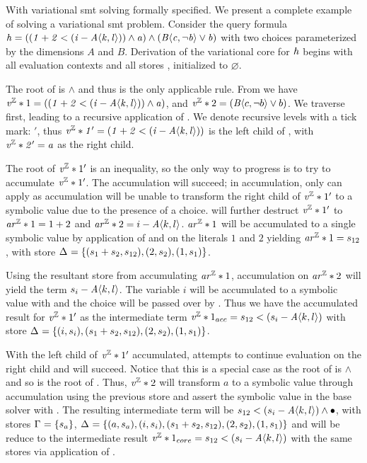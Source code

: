 \label{section:vsmt:example}
%
With variational \ac{smt} solving formally specified. We present a complete
example of solving a variational \ac{smt} problem. Consider the query formula
\newline$\kf{\hV = ((1 + 2 < (i - \chc[A]{k,l})) \wedge a) \wedge
  (\chc[B]{c,\neg b} \vee b)}$ with two choices parameterized by the dimensions
$A$ and $B$. Derivation of the variational core for $\mathit{h}$ begins with all
evaluation contexts and all stores \aStore{}, \eStore{} initialized to
$\varnothing$.

The root of \hV{} is $\wedge$ and thus \evAnd{} is the only applicable rule.
From \evAnd{} we have $\eIL*{1} = \kf{((1 + 2 < (i - \chc[A]{k,l})) \wedge a)}$,
and $\eIL*{2} = (\chc[B]{c,\neg b} \vee b)$. We traverse  first, leading
to a recursive application of \evAnd{}. We denote recursive levels with a tick
mark: $'$, thus $\kf{\eIL*{1}' = (1 + 2 < (i - \chc[A]{k,l}))}$ is the left
child of , with $\mathit{\mathit{v^{\mathbb{Z}}}*{2}' = a}$ as the right child.

The root of $\mathit{v^{\mathbb{Z}}}*{1}'$ is an inequality, so the only way to progress is to try
to accumulate $\mathit{v^{\mathbb{Z}}}*{1}'$. The accumulation will succeed; in accumulation, only
\acInEqV{} can apply as accumulation will be unable to transform the right child
of $\mathit{v^{\mathbb{Z}}}*{1}'$ to a symbolic value due to the presence of a choice. \acInEqV{}
will further destruct $\mathit{v^{\mathbb{Z}}}*{1}'$ to $\mathit{ar^{\mathbb{Z}}}*{1} = 1 + 2$ and $\eAR*{2} = i -
\chc[A]{k,l}$. $\mathit{ar^{\mathbb{Z}}}*{1}$ will be accumulated to a single symbolic value by
application of \acArithS{} and \acRef{} on the literals $1$ and $2$ yielding
$\mathit{ar^{\mathbb{Z}}}*{1} = s_{12}$, with store $\aStore{}=\set{(s_{1} + s_{2}, s_{12}),
  (2,s_{2}), (1,s_{1})}$.

Using the resultant store from accumulating $\mathit{ar^{\mathbb{Z}}}*{1}$, accumulation on
$\mathit{ar^{\mathbb{Z}}}*{2}$ will yield the term $s_{i} - \chc[A]{k,l}$. The variable $i$ will be
accumulated to a symbolic value with \acRef{} and the choice will be passed over
by \acChc{}. Thus we have the accumulated result for $\mathit{v^{\mathbb{Z}}}*{1}'$ as the
intermediate term $\eIL*{1}_{acc} = s_{12} < (s_{i} - \chc[A]{k,l})$ with store
$\aStore{}=\set{(i, s_{i}),(s_{1} + s_{2}, s_{12}), (2,s_{2}), (1,s_{1})}$.

With the left child of $\mathit{v^{\mathbb{Z}}}*{1}'$ accumulated, \evAnd{} attempts to continue
evaluation on the right child and will succeed. Notice that this is a special
case as the root of  is $\wedge$ and so is the root of \hV{}. Thus,
$\mathit{v^{\mathbb{Z}}}*{2}$ will transform $a$ to a symbolic value through accumulation using the
previous store and assert the symbolic value in the base solver with \evSym{}.
The resulting intermediate term will be $s_{12} < (s_{i} - \chc[A]{k,l}) \wedge
\unit{}$, with stores $\eStore{}=\set{s_{a}}$, $\aStore{}=\set{(a,s_{a}),(i,
  s_{i}),(s_{1} + s_{2}, s_{12}), (2,s_{2}), (1,s_{1})}$ and will be reduce to
the intermediate result $\eIL*{1}_{core} = s_{12} < (s_{i} - \chc[A]{k,l})$ with
the same stores via application of \evAndR{}.

